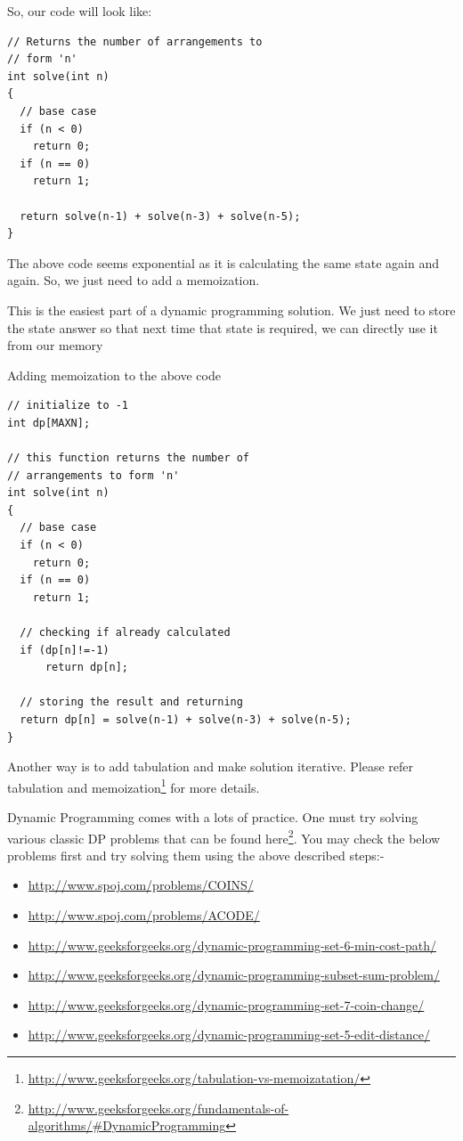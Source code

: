 So, our code will look like:
\begin{lstlisting}[style=raycppnewsnippet]
// Returns the number of arrangements to 
// form 'n' 
int solve(int n)
{ 
  // base case
  if (n < 0) 
    return 0;
  if (n == 0)  
    return 1;  
 
  return solve(n-1) + solve(n-3) + solve(n-5);
} 
\end{lstlisting}
The above code seems exponential as it is calculating the same state again
and again. So, we just need to add a memoization.


This is the easiest part of a dynamic programming solution. We just need to
store the state answer so that next time that state is required, we can
directly use it from our memory

Adding memoization to the above code
\begin{lstlisting}[style=raycppnewsnippet]
// initialize to -1
int dp[MAXN];
 
// this function returns the number of 
// arrangements to form 'n' 
int solve(int n)
{ 
  // base case
  if (n < 0)  
    return 0;
  if (n == 0)  
    return 1;
 
  // checking if already calculated
  if (dp[n]!=-1) 
      return dp[n];
 
  // storing the result and returning
  return dp[n] = solve(n-1) + solve(n-3) + solve(n-5);
}
\end{lstlisting}

Another way is to add tabulation and make solution iterative. Please refer
tabulation and
memoization\footnote{\url{http://www.geeksforgeeks.org/tabulation-vs-memoizatation/}}
for more details.

Dynamic Programming comes with a lots of practice. One must try solving
various classic DP problems that can be found
here\footnote{\url{http://www.geeksforgeeks.org/fundamentals-of-algorithms/#DynamicProgramming}}.
You may check the below problems first and try solving them using the above
described steps:-
\begin{itemize}%
\item \url{http://www.spoj.com/problems/COINS/}
\item \url{http://www.spoj.com/problems/ACODE/}
\item
  \url{http://www.geeksforgeeks.org/dynamic-programming-set-6-min-cost-path/}
\item 
  \url{http://www.geeksforgeeks.org/dynamic-programming-subset-sum-problem/}
\item
  \url{http://www.geeksforgeeks.org/dynamic-programming-set-7-coin-change/}
\item
  \url{http://www.geeksforgeeks.org/dynamic-programming-set-5-edit-distance/}
\end{itemize}


